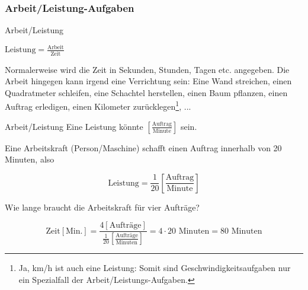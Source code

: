\newpage


\subsubsection{Arbeit/Leistung-Aufgaben}

\begin{gesetz}{Arbeit/Leistung}{}
  \begin{center}
    $\text{Leistung} = \frac{\text{Arbeit}}{\text{Zeit}}$
  \end{center}

  
\end{gesetz}

Normalerweise wird die Zeit in Sekunden, Stunden, Tagen etc. angegeben. Die
Arbeit hingegen kann irgend eine Verrichtung sein: Eine Wand
streichen, einen Quadratmeter schleifen, eine Schachtel herstellen,
einen Baum pflanzen, einen Auftrag erledigen, einen Kilometer zurücklegen\footnote{Ja, km/h ist auch eine Leistung: Somit sind Geschwindigkeitsaufgaben nur ein Spezialfall der Arbeit/Leistungs-Aufgaben.}, ...

\begin{beispiel}{Arbeit/Leistung}{}
  Eine Leistung könnte  $\left[\frac{\text{Auftrag}}{\text{Minute}}\right]$ sein.

  Eine Arbeitskraft (Person/Maschine) schafft einen Auftrag innerhalb von 20 Minuten, also

  $$\text{Leistung} = \frac1{20} \left[\frac{\text{Auftrag}}{\text{Minute}}\right]$$

  Wie lange braucht die Arbeitskraft für vier Aufträge?

  $$\text{Zeit} [\text{Min.}] = \frac{4[\text{Aufträge}]}{\frac{1}{20} \left[\frac{\text{Aufträge}}{\text{Minuten}}\right]} = 4\cdot{} 20 \text{ Minuten} = 80 \text{ Minuten}$$
\end{beispiel}
\newpage

